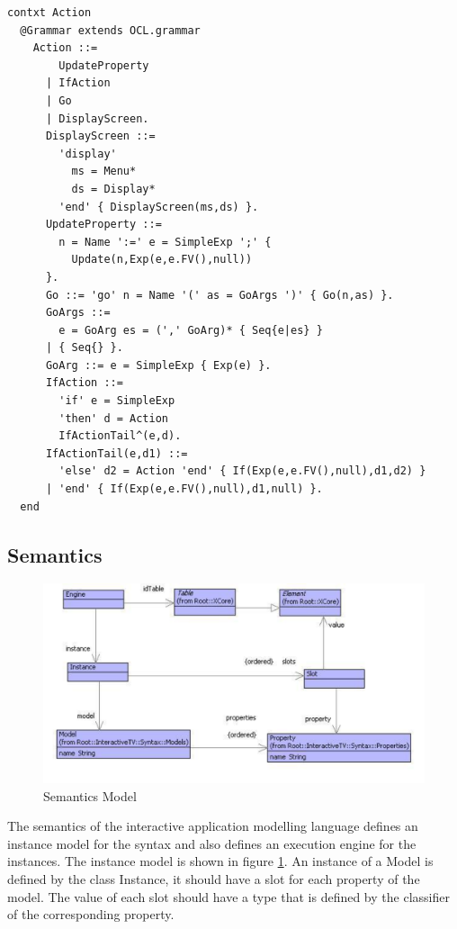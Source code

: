 \begin{lstlisting}
contxt Action
  @Grammar extends OCL.grammar
    Action ::=
        UpdateProperty
      | IfAction
      | Go
      | DisplayScreen.
      DisplayScreen ::= 
        'display' 
          ms = Menu* 
          ds = Display* 
        'end' { DisplayScreen(ms,ds) }.
      UpdateProperty ::=
        n = Name ':=' e = SimpleExp ';' {
          Update(n,Exp(e,e.FV(),null))  
      }.
      Go ::= 'go' n = Name '(' as = GoArgs ')' { Go(n,as) }.
      GoArgs ::= 
        e = GoArg es = (',' GoArg)* { Seq{e|es} }
      | { Seq{} }.
      GoArg ::= e = SimpleExp { Exp(e) }.
      IfAction ::=
        'if' e = SimpleExp
        'then' d = Action
        IfActionTail^(e,d).
      IfActionTail(e,d1) ::=
        'else' d2 = Action 'end' { If(Exp(e,e.FV(),null),d1,d2) }
      | 'end' { If(Exp(e,e.FV(),null),d1,null) }. 
  end
\end{lstlisting}
\subsection{Semantics}

%
\begin{figure}
\begin{center}

\includegraphics[width=12cm]{LanguageEngineering/Interactive/Images/Engine}

\caption{Semantics Model\label{fig:Semantics-Model}}

\end{center}
\end{figure}


The semantics of the interactive application modelling language defines
an instance model for the syntax and also defines an execution engine
for the instances. The instance model is shown in figure \ref{fig:Semantics-Model}.
An instance of a Model is defined by the class Instance, it should
have a slot for each property of the model. The value of each slot
should have a type that is defined by the classifier of the corresponding
property.

